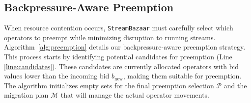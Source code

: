 \documentclass[lettersize,journal]{IEEEtran}
\begin{document}
\subsection{Backpressure-Aware Preemption}
\label{subsec:backpressure_preemption}

When resource contention occurs, \texttt{StreamBazaar} must carefully select which operators to preempt while minimizing disruption to running streams. Algorithm~\ref{alg:preemption} details our backpressure-aware preemption strategy.
This process starts by identifying potential candidates for preemption (Line \ref{line:candidates}). These candidates are currently allocated operators with bid values lower than the incoming bid $b_{\text{new}}$, making them suitable for preemption. The algorithm initializes empty sets for the final preemption selection $\mathcal{P}$ and the migration plan $\mathcal{M}$ that will manage the actual operator movements.
\end{document}
